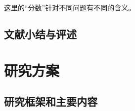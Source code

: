 \documentclass[finalformat,mathCMR]{HUSTthesis}
\begin{document}
这里的“分数”针对不同问题有不同的含义。

\section{文献小结与评述}


\chapter{研究方案}
\section{研究框架和主要内容}

\end{document}
